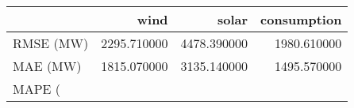 \begin{tabular}{lrrr}
\toprule
 & wind & solar & consumption \\
\midrule
RMSE (MW) & 2295.710000 & 4478.390000 & 1980.610000 \\
MAE (MW) & 1815.070000 & 3135.140000 & 1495.570000 \\
MAPE (%
\bottomrule
\end{tabular}
